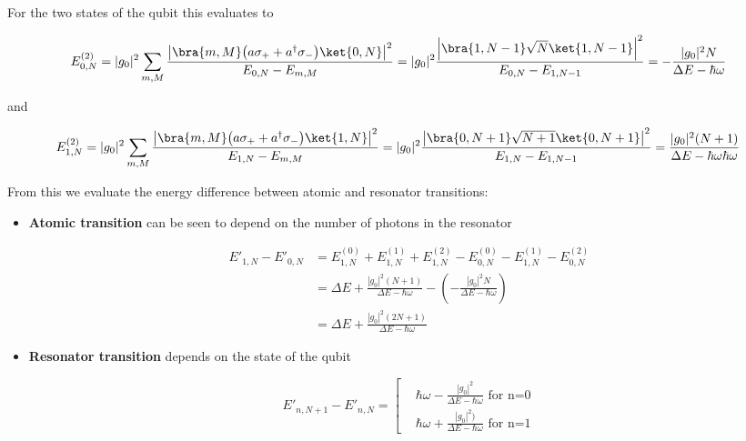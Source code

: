 \noindent For the two states of the qubit this evaluates to

\begin{equation}\label{sec0}
  E_{0,N}^{(2)} = |g_0|^2\sum_{m,M}\frac{\left|\bra{m,M}\big(a\sigma_{+}+a^{\dagger}\sigma_{-}\big)\ket{0,N}\right|^2}{E_{0,N}-E_{m,M}}= |g_0|^2\frac{\left|\bra{1,N-1}\sqrt{N}\ket{1,N-1}\right|^2}{E_{0,N}-E_{1,N-1}} = -\frac{|g_0|^2N}{\Delta E - \hbar\omega}
\end{equation}

\noindent and

\begin{equation}\label{sec1}
  E_{1,N}^{(2)} = |g_0|^2\sum_{m,M}\frac{\left|\bra{m,M}\big({a\sigma_{+}}+a^{\dagger}\sigma_{-}\big)\ket{1,N}\right|^2}{E_{1,N}-E_{m,M}}= |g_0|^2\frac{\left|\bra{0,N+1}\sqrt{N+1}\ket{0,N+1}\right|^2}{E_{1,N}-E_{1,N-1}} = \frac{|g_0|^2(N+1)}{\Delta E - \hbar\omega \hbar\omega}
\end{equation}

\noindent  From  this  we  evaluate  the energy  difference  between  atomic  and
resonator transitions:

\begin{itemize}
\item \textbf{Atomic transition}  can be seen to depend on  the number of photons
  in the resonator

  \begin{equation}\label{secAtom}\begin{aligned}
      E'_{1,N}-E'_{0,N}  &  = E_{1,N}^{(0)}  +  E_{1,N}^{(1)}  + E_{1,N}^{(2)}  -
      E_{0,N}^{(0)}  -   E_{1,N}^{(1)}  -   E_{0,N}^{(2)}  \\&   =  \Delta   E  +
      \frac{|g_0|^2(N+1)}{\Delta E - \hbar\omega}  - (-\frac{|g_0|^2N}{\Delta E -
        \hbar\omega})\\&    =   {\Delta    E+\frac{|g_0|^2(2N+1)}{\Delta   E    -
          \hbar\omega}}
    \end{aligned}
  \end{equation}
\item \textbf{Resonator transition} depends on the state of the qubit

  \begin{equation}\label{secRes}
    E'_{n,N+1}-E'_{n,N} = \left[\begin{aligned}
        & \hbar\omega  -\frac{|g_0|^2}{\Delta E -  \hbar\omega} \text{ for n=0}
        \\&  \hbar\omega + {\frac{|g_0|^2)}{\Delta E -  \hbar\omega}}\text{ for n=1}
      \end{aligned}\right.
  \end{equation}
\end{itemize}

